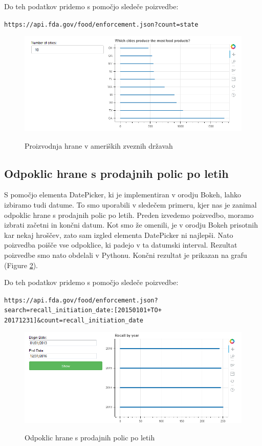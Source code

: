 \documentclass[a4paper,10pt]{article}
\begin{document}
{{\vspace{5mm}
Do teh podatkov pridemo s pomočjo sledeče poizvedbe:

\vspace{5mm}
\texttt{https://api.fda.gov/food/enforcement.json?count=state}



\begin{figure}[H]
  \caption{Proizvodnja hrane v ameriških zveznih državah}
  \centering
    \includegraphics[width=1\textwidth]{foodProd.png}
    \label{fP}
\end{figure}

\subsection{Odpoklic hrane s prodajnih polic po letih}
S pomočjo elementa DatePicker, ki je implementiran v orodju Bokeh, lahko izbiramo tudi datume. To smo uporabili v sledečem primeru, kjer nas je zanimal odpoklic hrane s prodajnih polic po letih. Preden izvedemo poizvedbo, moramo izbrati začetni in končni datum. Kot smo že omenili, je v orodju Bokeh prisotnih kar nekaj hroščev, zato sam izgled elementa DatePicker ni najlepši. Nato poizvedba poišče vse odpoklice, ki padejo v ta datumski interval. Rezultat poizvedbe smo nato obdelali v Pythonu. Končni rezultat je prikazan na grafu (Figure \ref{recall}).

\vspace{5mm}
Do teh podatkov pridemo s pomočjo sledeče poizvedbe:

\vspace{5mm}
\texttt{https://api.fda.gov/food/enforcement.json?}\newline
\texttt{search=recall\_initiation\_date:[20150101+TO+}\newline 
\texttt{20171231]\&count=recall\_initiation\_date}

\begin{figure}[H]
  \caption{Odpoklic hrane s prodajnih polic po letih}
  \centering
    \includegraphics[width=1\textwidth]{recallByYear.png}
    \label{recall}
\end{figure}

}}
\end{document}
